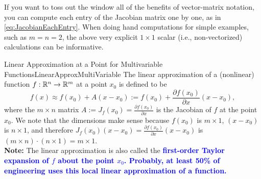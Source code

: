 If you want to toss out the window all of the benefits of vector-matrix notation, you can compute each entry of the Jacobian matrix one by one, as in \eqref{eq:JacobianEachEntry}.
When doing hand computations for simple examples, such as $m=n=2$, the above very explicit $1 \times 1$ scalar (i.e., non-vectorized) calculations can be informative.

\newpage

\begin{propColor}{Linear Approximation at a Point for Multivariable Functions}{LinearApproxMultiVariable}
The linear approximation of a (nonlinear) function $f:\mathbb R^{n} \to \mathbb R^{m} $ at a point $x_0$ is defined to be
 \begin{equation}
     \label{eq:DefineVectorLinearApprox}
     f(x) \approx f(x_0) + A ( x - x_0) := f(x_0) + \frac{\partial f(x_0)}{\partial x} ( x - x_0),
 \end{equation}
 where the $m \times n$ matrix $A:=J_f(x_0)=\frac{\partial f(x_0)}{\partial x}$ is the Jacobian of $f$ at the point $x_0$. We note that the dimensions make sense because $f(x_0)$ is $m \times 1$, $( x - x_0)$ is $n \times 1$, and therefore $J_f(x_0)( x - x_0) = \frac{\partial f(x_0)}{\partial x}  ( x - x_0)$ is $(m \times n) \cdot (n \times 1) = m \times 1$.  \\

 \textbf{Note:} The linear approximation is also called the \textcolor{blue}{\bf first-order Taylor expansion of $f$ about the point $x_0$. Probably, at least 50\% of engineering uses this local linear approximation of a function.}
\end{propColor}

\vspace*{0.2cm}

